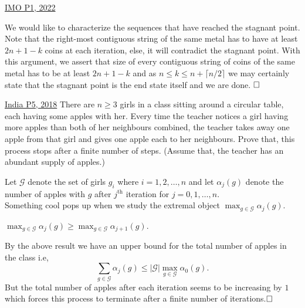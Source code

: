 \begin{problem}{3}{\href{https://artofproblemsolving.com/community/q1h2883211p34203276}{IMO P1, 2022}}
\begin{solution}
	\indent We would like to characterize the sequences that have reached the stagnant point. Note that the right-most contiguous string of the same metal has to have at least $2n+1-k$ coins at each iteration, else, it will contradict the stagnant point. With this argument, we assert that size of every contiguous string of coins of the same metal has to be at least $2n+1-k$ and as $n\le k\le n+\lceil n/2\rceil$ we may certainly state that the stagnant point is the end state itself and we are done. $\qedwhite$
	\end{solution}
\end{problem}
	
\begin{problem}{4}{\href{https://artofproblemsolving.com/community/q1h1578516p32946994}{India P5, 2018}}
	There are $n\ge 3$ girls in a class sitting around a circular table, each having some apples with her. Every time the teacher notices a girl having more apples than both of her neighbours combined, the teacher takes away one apple from that girl and gives one apple each to her neighbours. Prove that, this process stops after a finite number of steps. (Assume that, the teacher has an abundant supply of apples.)
	\begin{solution}Let $\mathcal{G}$ denote the set of girls $g_i$ where $i=1,2,\ldots,n $ and let $\alpha_j(g)$ denote the number of apples with $g$ after $j^{\text{th}}$ iteration for $j=0,1,\ldots,n$.\\
	Something cool pops up when we study the extremal object $\displaystyle\max_{g\in\mathcal{G}}\alpha_j{(g)}$.

	\begin{lemma}{1}
		$\displaystyle\max_{g\in\mathcal{G}}\alpha_{j}{(g)}\ge \displaystyle\max_{g\in\mathcal{G}}\alpha_{j+1}{(g)}$.
	\end{lemma}
	By the above result we have an upper bound for the total number of apples in the class i.e,
$$\sum_{g\in\mathcal{G}}\alpha_{j}(g)\le |\mathcal{G}|\max_{g\in\mathcal{G}}\alpha_{0}{(g)}.$$But the total number of apples after each iteration seems to be increasing by $1$ which forces this process to terminate after a finite number of iterations.$\qedwhite$
	\end{solution}
\end{problem}

